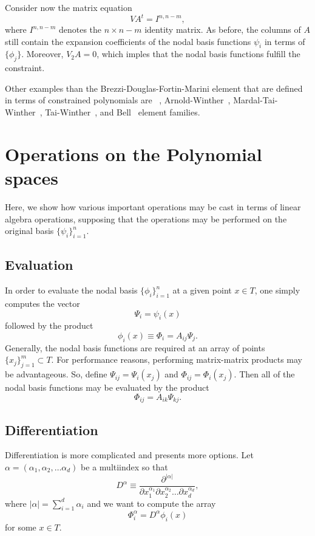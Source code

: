 Consider now the matrix
equation
\begin{equation}
\label{eq:extendedvdmsystem}
V A^t = I^{n,n-m},
\end{equation}
where \( I^{n,n-m} \) denotes the \( n \times n-m \) identity matrix.  
As before, the columns of \( A \) still
contain the expansion coefficients of the nodal basis functions
\( \psi_i \) in terms of \( \{ \phi_j \} \).
Moreover, \( V_2 A = 0 \), which imples that the nodal basis functions
fulfill the constraint. 

Other examples than the Brezzi-Douglas-Fortin-Marini element 
that are defined in terms of constrained polynomials are 
\nedelec~\citep{Nedelec1980}, Arnold-Winther~\citep{ArnoldWinther2002},
Mardal-Tai-Winther~\citep{MardalTaiWinther2002}, 
Tai-Winther~\citep{TaiWinther2006}, and Bell~\citep{Ciarlet2002} element families.


\section{Operations on the Polynomial spaces}
Here, we show how various important operations may be cast
in terms of linear algebra operations, supposing that the operations may be performed on
the original basis \( \{ \psi_i \}_{i=1}^{n} \).

\subsection{Evaluation}
In order to evaluate the nodal basis \( \{ \phi_i \}_{i=1}^{n} \)
at a given point \( x \in T \), one simply computes the vector
\[
\Psi_i = \psi_i(x)
\]
followed by the product
\[
\phi_i(x) \equiv \Phi_i = A_{ij} \Psi_j.
\]
Generally, the nodal basis functions are required at an array of
points \( \{ x_j \}_{j=1}^{m} \subset T \).  For performance reasons,
performing matrix-matrix products may be advantageous.  So, define
\( \Psi_{ij} = \Psi_i(x_j) \)  and \( \Phi_{ij} = \Phi_i(x_j) \).
Then all of the nodal basis functions may be evaluated by the
product
\[
\Phi_{ij} = A_{ik} \Psi_{kj}.
\]
\subsection{Differentiation}
Differentiation is more complicated and presents more options.
Let \( \alpha = ( \alpha_1 , \alpha_2 , \dots \alpha_d ) \) be a
multiindex so that
\[
D^\alpha \equiv \frac{\partial^{|\alpha|}}{\partial
  x_1^{\alpha_1} \partial x_2^{\alpha_2} \dots \partial x_d^{\alpha_d}},
\]
where \( |\alpha| = \sum_{i=1}^{d} \alpha_i \) and we want 
to compute the array
\[
\Phi^\alpha_i = D^\alpha \phi_i(x)
\]
for some \( x \in T \).

